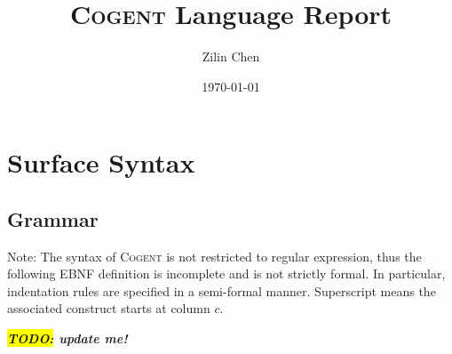 \documentclass[a4paper]{article}
\newcommand{\TODO}[1]{\textbf{\textsl{\colorbox{yellow}{TODO:} #1}}}
\newcommand{\todo}[1]{\TODO{#1}}
\newcommand{\cogent}{\textsc{Cogent}\xspace}
\begin{document}
\title{\cogent Language Report}
\author{Zilin Chen}
\date{\today}

\maketitle

\section{Surface Syntax}

\subsection{Grammar} \label{ssec:grammar}
Note: The syntax of \cogent is not restricted to regular expression, thus the following EBNF definition is incomplete and is
not strictly formal. In particular, indentation rules are specified in a semi-formal manner. Superscript  means
the associated construct starts at column $c$.

\todo{update me!}
\end{document}
